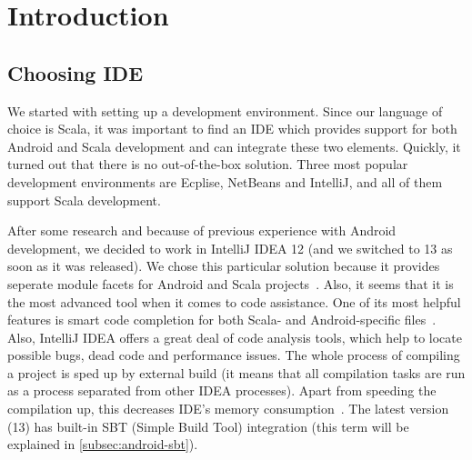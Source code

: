 %
%
%
%
%

\section{Introduction}
\label{sec:impl-intro}

\subsection{Choosing IDE}
\label{subsec:choosing-ide}
We started with setting up a development environment. Since our language of choice is Scala, it was important to find an IDE which provides support for both Android and Scala development and can integrate these two elements. Quickly, it turned out that there is no out-of-the-box solution. Three most popular development environments are Ecplise, NetBeans and IntelliJ, and all of them support Scala development. 

After some research and because of previous experience with Android development, we decided to work in IntelliJ IDEA 12 (and we switched to 13 as soon as it was released). We chose this particular solution because it provides seperate module facets for Android and Scala projects~\cite{Steingress:2011:AndroidScala}. Also, it seems that it is the most advanced tool when it comes to code assistance. One of its most helpful features is smart code completion for both Scala- and Android-specific files~\cite{Steingress:2011:AndroidScala}. Also, IntelliJ IDEA offers a great deal of code analysis tools, which help to locate possible bugs, dead code and performance issues. The whole process of compiling a project is sped up by external build (it means that all compilation tasks are run as a process separated from other IDEA processes). Apart from speeding the compilation up, this decreases IDE's memory consumption~\cite{Fatin:2012:NewWay}. The latest version (13) has built-in SBT (Simple Build Tool) integration (this term will be explained in \cref{subsec:android-sbt}).

